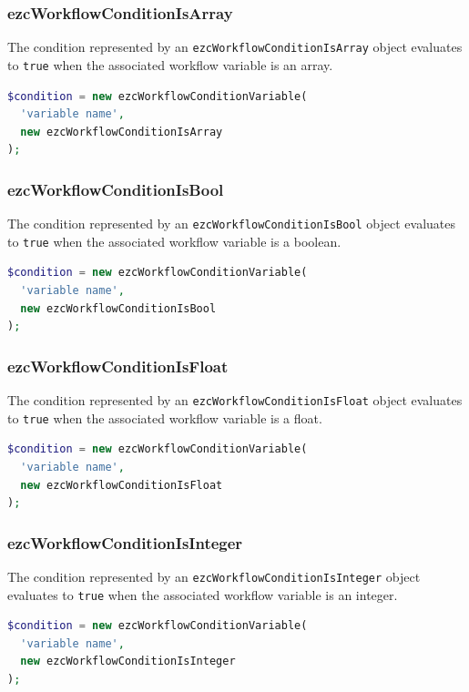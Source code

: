 \subsubsection{ezcWorkflowConditionIsArray}

The condition represented by an \texttt{ezcWorkflowConditionIsArray}
object evaluates to \texttt{true} when the associated workflow variable is
an array.

\begin{lstlisting}[language=PHP]
$condition = new ezcWorkflowConditionVariable(
  'variable name',
  new ezcWorkflowConditionIsArray
);
\end{lstlisting}

\subsubsection{ezcWorkflowConditionIsBool}

The condition represented by an \texttt{ezcWorkflowConditionIsBool}
object evaluates to \texttt{true} when the associated workflow variable is
a boolean.

\begin{lstlisting}[language=PHP]
$condition = new ezcWorkflowConditionVariable(
  'variable name',
  new ezcWorkflowConditionIsBool
);
\end{lstlisting}

\subsubsection{ezcWorkflowConditionIsFloat}

The condition represented by an \texttt{ezcWorkflowConditionIsFloat}
object evaluates to \texttt{true} when the associated workflow variable is
a float.

\begin{lstlisting}[language=PHP]
$condition = new ezcWorkflowConditionVariable(
  'variable name',
  new ezcWorkflowConditionIsFloat
);
\end{lstlisting}

\subsubsection{ezcWorkflowConditionIsInteger}

The condition represented by an \texttt{ezcWorkflowConditionIsInteger}
object evaluates to \texttt{true} when the associated workflow variable is
an integer.

\begin{lstlisting}[language=PHP]
$condition = new ezcWorkflowConditionVariable(
  'variable name',
  new ezcWorkflowConditionIsInteger
);
\end{lstlisting}


